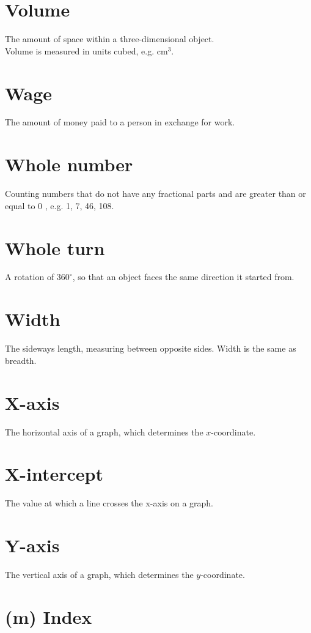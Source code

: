 \documentclass[10pt]{article}
\begin{document}
\section*{Volume}
The amount of space within a three-dimensional object.\\
Volume is measured in units cubed, e.g. $\mathrm{cm}^{3}$.

\section*{Wage}
The amount of money paid to a person in exchange for work.

\section*{Whole number}
Counting numbers that do not have any fractional parts and are greater than or equal to 0 , e.g. 1, 7, 46, 108.

\section*{Whole turn}
A rotation of $360^{\circ}$, so that an object faces the same direction it started from.

\section*{Width}
The sideways length, measuring between opposite sides. Width is the same as breadth.

\section*{X-axis}
The horizontal axis of a graph, which determines the $x$-coordinate.

\section*{X-intercept}
The value at which a line crosses the x-axis on a graph.

\section*{Y-axis}
The vertical axis of a graph, which determines the $y$-coordinate.

\section*{(m) Index}
\end{document}
